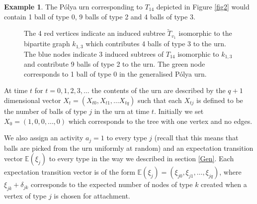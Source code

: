\documentclass[12pt]{article} %
\theoremstyle{definition}
\newtheorem{ex}[thm]{Example}
\begin{document}
 \begin{ex}
  The P\'{o}lya urn corresponding to $T_{14}$ depicted in Figure \ref{fig2} would contain 1 ball of type 0, 9 balls of type 2 and 4 balls of type 3. 
  
  \begin{figure}[H]\label{fig3}
\centering
{}
\caption{The 4 red vertices indicate an induced subtree $\tilde{T}_{v_{1}}$ isomorphic to the bipartite graph $k_{1,3}$ which contributes 4 balls of type 3 to the urn.  The blue nodes indicate 3 induced subtrees of $T_{14}$ isomorphic to $k_{1,3}$ and contribute 9 balls of type 2 to the urn.  The green node corresponds to 1 ball of type 0 in the generalised P\'{o}lya urn.}\label{fig3}
\end{figure}
 \end{ex}

 
At time $t$ for $t = 0,1,2,3,\dots$ the contents of the urn are described by the $q+1$ dimensional vector $X_{t} = (X_{t0},X_{t1}, \dots X_{tq})$ such that each $X_{tj}$ is defined to be the number of balls of type $j$ in the urn at time $t$.  Initially we set $X_{0} = (1,0,0,\dots,0)$ which corresponds to the tree with one vertex and no edges. 

We also assign an activity $a_{j} = 1$ to every type $j$ (recall that this means that balls are picked from the urn uniformly at random) and an expectation transition vector $\mathbb{E}(\xi_{j})$  to every type in the way we described in section \ref{Gen}.  Each expectation transition vector is of the form  $\mathbb{E}(\xi_{j}) = (\xi_{j0},\xi_{j1},\dots,\xi_{jq})$,  where $\xi_{jk} + \delta_{jk}$ corresponds to the expected number of nodes of type $k$ created when a vertex of type $j$ is chosen for attachment.
 
\end{document}
